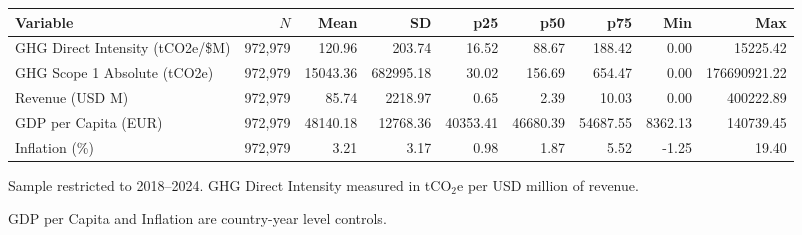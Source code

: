   \begin{threeparttable}
  \small
  \begin{tabular}{l r r r r r r r r}
    \hline\hline
    Variable & $N$ & Mean & SD & p25 & p50 & p75 & Min & Max \\
    \hline
    GHG Direct Intensity (tCO2e/\$M) & 972,979 & 120.96 & 203.74 & 16.52 & 88.67 & 188.42 & 0.00 & 15225.42 \\
    GHG Scope 1 Absolute (tCO2e) & 972,979 & 15043.36 & 682995.18 & 30.02 & 156.69 & 654.47 & 0.00 & 176690921.22 \\
    Revenue (USD M) & 972,979 & 85.74 & 2218.97 & 0.65 & 2.39 & 10.03 & 0.00 & 400222.89 \\
    GDP per Capita (EUR) & 972,979 & 48140.18 & 12768.36 & 40353.41 & 46680.39 & 54687.55 & 8362.13 & 140739.45 \\
    Inflation (\%) & 972,979 & 3.21 & 3.17 & 0.98 & 1.87 & 5.52 & -1.25 & 19.40 \\
    \hline\hline
  \end{tabular}
  \begin{tablenotes}
    \footnotesize
    \item Sample restricted to 2018--2024. GHG Direct Intensity measured in tCO$_2$e per USD million of revenue.
    \item GDP per Capita and Inflation are country-year level controls.
  \end{tablenotes}
  \end{threeparttable}